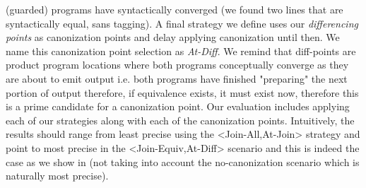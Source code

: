 (guarded) programs have syntactically converged (we found two lines that are syntactically equal, sans tagging). A final strategy we define uses our \emph{differencing points} as canonization points and delay applying canonization until then. We name this canonization point selection as \emph{At-Diff}. We remind that diff-points are product program locations where both programs conceptually converge as they are about to emit output i.e. both programs have finished "preparing" the next portion of output therefore, if equivalence exists, it must exist now, therefore this is a prime candidate for a canonization point. Our evaluation includes applying each of our strategies along with each of the canonization points. Intuitively, the results should range from least precise using the <Join-All,At-Join> strategy and point to most precise in the <Join-Equiv,At-Diff> scenario and this is indeed the case as we show in  (not taking into account the no-canonization scenario which is naturally most precise).



